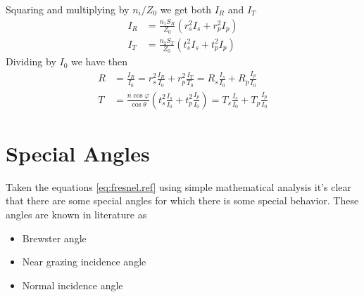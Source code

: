 \documentclass[../electromagnetism.tex]{subfiles}
\begin{document}
Squaring and multiplying by $n_{i}/Z_{0}$ we get both $I_R$ and $I_T$
\begin{equation*}
	\begin{aligned}
		I_{R}&= \frac{n_1S_R}{Z_0}\left( r_s^2I_s+r_p^2I_p \right)\\
		I_T&= \frac{n_2S_T}{Z_0}\left( t_s^2I_s+t_p^2I_p \right)
	\end{aligned}
\end{equation*}
Dividing by $I_0$ we have then
\begin{equation}
	\begin{aligned}
		R&= \frac{I_R}{I_0}=r_s^2\frac{I_R}{I_0}+r_p^2\frac{I_T}{T_0}=R_s\frac{I_s}{I_0}+R_p\frac{I_p}{I_0}\\
		T&= \frac{n\cos\varphi}{\cos\theta}\left( t_s^2\frac{I_s}{I_0}+t_p^2\frac{I_p}{I_0} \right)=T_s\frac{I_s}{I_0}+T_p\frac{I_p}{I_0}
	\end{aligned}
	\label{eq:RTgenpol.ref}
\end{equation}
\section{Special Angles}
Taken the equations \eqref{eq:fresnel.ref} using simple mathematical analysis it's clear that there are some special angles for which there is some special behavior. These angles are known in literature as
\begin{itemize}
\item Brewster angle
\item Near grazing incidence angle
\item Normal incidence angle
\end{itemize}
\end{document}
